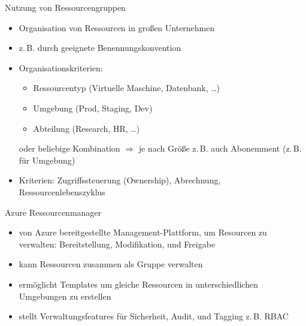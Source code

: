 \begin{flashcard}[\ ]{Nutzung von Ressourcengruppen}
    \begin{itemize}
        \item Organisation von Ressourcen in großen Unternehmen
        \item z.\,B. durch geeignete Benennungskonvention
        \item Organisationskriterien:
            \begin{itemize}
                \item Ressourcentyp (Virtuelle Maschine, Datenbank, \ldots)
                \item Umgebung (Prod, Staging, Dev)
                \item Abteilung (Research, HR, \ldots)
            \end{itemize}
            oder beliebige Kombination\newline
            $\Rightarrow$ je nach Größe z.\,B. auch Abonemment (z.\,B. für Umgebung)
        \item Kriterien: Zugriffssteuerung (Ownership), Abrechnung, Ressourcenlebenszyklus
    \end{itemize}

\end{flashcard}

\begin{flashcard}[Definition]{Azure Ressourcenmanager}
    \begin{itemize}
        \item von Azure bereitgestellte Management-Plattform, um Resourcen zu verwalten:\newline
        Bereitstellung, Modifikation, und Freigabe
        \item kann Ressourcen zusammen als Gruppe verwalten
        \item ermöglicht Templates um gleiche Ressourcen in unterschiedlichen Umgebungen zu erstellen
        \item stellt Verwaltungsfeatures für Sicherheit, Audit, und Tagging\newline
        z.\,B. RBAC
    \end{itemize}

\end{flashcard}


